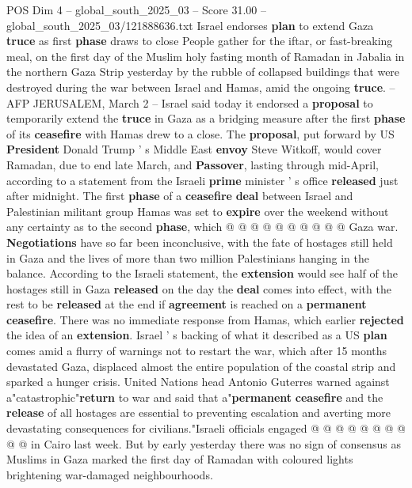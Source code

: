 \begin{textsample}{POS Dim 4 – global\_south\_2025\_03 – Score 31.00 – global\_south\_2025\_03/121888636.txt}  \label{ex:f4_pos_035}
Israel endorses \textbf{plan} to extend Gaza \textbf{truce} as first \textbf{phase} draws to close People gather for the iftar, or fast-breaking meal, on the first day of the Muslim holy fasting month of Ramadan in Jabalia in the northern Gaza Strip yesterday by the rubble of collapsed buildings that were destroyed during the war between Israel and Hamas, amid the ongoing \textbf{truce}. -- AFP JERUSALEM, March 2 -- Israel said today it endorsed a \textbf{proposal} to temporarily extend the \textbf{truce} in Gaza as a bridging measure after the first \textbf{phase} of its \textbf{ceasefire} with Hamas drew to a close.
The \textbf{proposal}, put forward by US \textbf{President} Donald Trump ' s Middle East \textbf{envoy} Steve Witkoff, would cover Ramadan, due to end late March, and \textbf{Passover}, lasting through mid-April, according to a statement from the Israeli \textbf{prime} minister ' s office \textbf{released} just after midnight.
The first \textbf{phase} of a \textbf{ceasefire} \textbf{deal} between Israel and Palestinian militant group Hamas was set to \textbf{expire} over the weekend without any certainty as to the second \textbf{phase}, which @ @ @ @ @ @ @ @ @ @ Gaza war. \textbf{Negotiations} have so far been inconclusive, with the fate of hostages still held in Gaza and the lives of more than two million Palestinians hanging in the balance.
According to the Israeli statement, the \textbf{extension} would see half of the hostages still in Gaza \textbf{released} on the day the \textbf{deal} comes into effect, with the rest to be \textbf{released} at the end if \textbf{agreement} is reached on a \textbf{permanent} \textbf{ceasefire}.
There was no immediate response from Hamas, which earlier \textbf{rejected} the idea of an \textbf{extension}.
Israel ' s backing of what it described as a US \textbf{plan} comes amid a flurry of warnings not to restart the war, which after 15 months devastated Gaza, displaced almost the entire population of the coastal strip and sparked a hunger crisis.
United Nations head Antonio Guterres warned against a"catastrophic"\textbf{return} to war and said that a"\textbf{permanent} \textbf{ceasefire} and the \textbf{release} of all hostages are essential to preventing escalation and averting more devastating consequences for civilians."Israeli officials engaged @ @ @ @ @ @ @ @ @ @ in Cairo last week.
But by early yesterday there was no sign of consensus as Muslims in Gaza marked the first day of Ramadan with coloured lights brightening war-damaged neighbourhoods.

\end{textsample}
